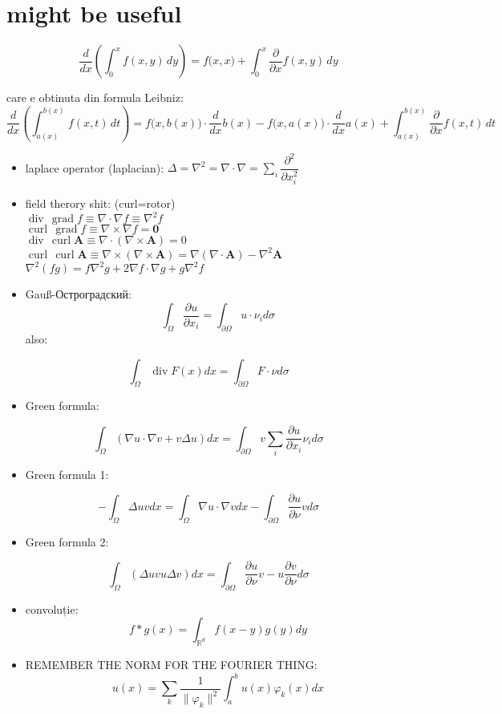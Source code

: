 \documentclass[11pt]{article}
\date{\today}
\title{}
\newcommand{\R}{\mathbb{R}} \newcommand{\C}{\mathbb{C}}
\renewcommand{\phi}{\varphi} \newcommand{\parti}[2]{\frac{\partial #1}{\partial #2}}
\begin{document}
\section*{might be useful}
\label{sec:org04e0e7d}
\[ \frac{d}{dx} \left (\int_{0}^{x} f(x,y)\,dy \right) = f\big(x,x) + \int_{0}^{x}\frac{\partial}{\partial x} f(x,y) \,dy\]

\medskip

care e obtinuta din formula Leibniz:
\[ \frac{d}{dx} \left (\int_{a(x)}^{b(x)}f(x,t)\,dt \right) = f\big(x,b(x)\big)\cdot \frac{d}{dx} b(x) - f\big(x,a(x)\big)\cdot \frac{d}{dx} a(x) + \int_{a(x)}^{b(x)}\frac{\partial}{\partial x} f(x,t) \,dt\]
\begin{itemize}
\item laplace operator (laplacian): \(\Delta = \nabla^2 = \nabla \cdot \nabla = \displaystyle \sum_i \dfrac{\partial^2}{\partial x_i^2}\)
\item field therory shit: (curl=rotor)\\
\(\operatorname{div}  \, \operatorname{grad} f          \equiv \nabla \cdot  \nabla f \equiv \nabla^2 f\)\\
\(\operatorname{curl} \, \operatorname{grad} f          \equiv \nabla \times \nabla f = \mathbf 0\)\\
\(\operatorname{div}  \, \operatorname{curl} \mathbf{A} \equiv \nabla \cdot  (\nabla \times \mathbf{A}) = 0\)\\
\(\operatorname{curl} \, \operatorname{curl} \mathbf{A} \equiv \nabla \times (\nabla \times \mathbf{A}) = \nabla (\nabla \cdot \mathbf{A}) - \nabla^2 \mathbf{A}\)\\
\(\nabla^2 (f g) = f \nabla^2 g + 2 \nabla f \cdot \nabla g + g \nabla^2 f\)
\item Gauß-Остроградский:
\[ \int_\Omega \parti{u}{x_i} = \int_{\partial \Omega}u \cdot \nu_i d \sigma \]
also:
\end{itemize}
\[ \int_\Omega \operatorname{div} F (x) dx = \int_{\partial \Omega} F  \cdot \nu d \sigma \]
\begin{itemize}
\item Green formula:
\end{itemize}
\[\int_\Omega (\nabla u \cdot \nabla v  + v \Delta u) dx = \int_{\partial \Omega} v \sum_i \parti{u}{x_i} \nu_i d \sigma \]
\begin{itemize}
\item Green formula 1:
\end{itemize}
\[ -\int_\Omega \Delta u v dx = \int_\Omega \nabla u \cdot \nabla v dx - \int_{\partial \Omega} \parti{u}{\nu} v  d \sigma \]
\begin{itemize}
\item Green formula 2:
\end{itemize}
\[ \int_\Omega (\Delta u v u\Delta v) dx = \int_{\partial \Omega} \parti{u}{\nu} v - u \parti{v}{\nu}  d \sigma \]
\begin{itemize}
\item convoluție:
\[ f*g (x) = \int_{\R^d} f(x-y) g(y)dy \]
\item REMEMBER THE NORM FOR THE FOURIER THING:
\[ u(x) = \sum_k \frac{1}{\|\phi_k\|^2} \int_a^b u(x) \phi_k(x) dx \]
\end{itemize}
\end{document}
